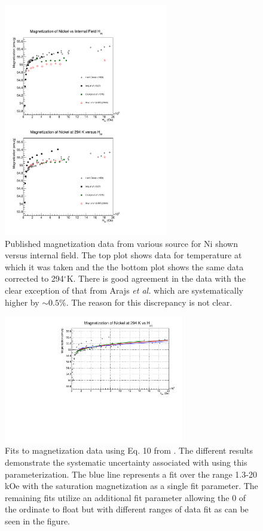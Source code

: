 \documentclass[12pt]{article}
\begin{document}
\begin{figure}
\centering
\includegraphics[width=0.64\textwidth]{NiMagnetization_vs_Hint.pdf}
\caption{Published magnetization data from various source for Ni shown versus internal field. The top plot shows data for temperature at which it was taken and the the bottom plot shows the same data corrected to 294$^{\circ}$K. There is good agreement in the data with the clear exception of that from Arajs {\it et al.} which are systematically higher by $\sim0.5\%$. The reason for this discrepancy is not clear.}
\label{fig:mag_Ni}
\end{figure}
\begin{figure}
\centering
\includegraphics[width=0.7\textwidth]{NiCombinedFit_vs_Hint.pdf}
\caption{Fits to magnetization data using Eq. 10 from \cite{PauthenetMar1982}. The different results demonstrate the systematic uncertainty associated with using this parameterization. The blue line represents a fit over the range 1.3-20 kOe with the saturation magnetization as a single fit parameter. The remaining fits utilize an additional fit parameter allowing the 0 of the ordinate to float but with different ranges of data fit as can be seen in the figure.}
\label{fig:mag_fit_Ni}
\end{figure}
\end{document}
